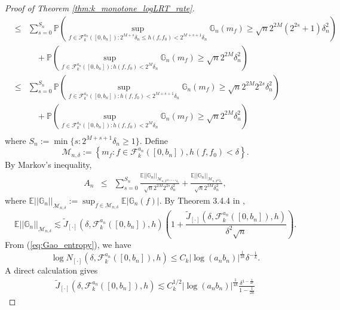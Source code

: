 \documentclass[12pt,letterpaper, twoside, openany]{article}
\theoremstyle{plain}
\begin{document}
\begin{proof}[Proof of Theorem \ref{thm:k_monotone_logLRT_rate}]
\begin{eqnarray*}
	& \leq & \sum^{S_n}_{s=0} \mathbb{P}  \left( \sup_{f \in \mathcal{F}^{a_n}_k([0, b_n]): 2^{M+s} \delta_n \leq  h(f, f_0) < 2^{M + s + 1} \delta_n}  \mathbb{G}_n(m_f)  \geq \sqrt{n} 2^{2M} (2^{2s} + 1) \delta^2_n \right) \\
	&& \quad + \mathbb{P}  \left( \sup_{f \in \mathcal{F}^{a_n}_k([0, b_n]):   h(f, f_0) < 2^M \delta_n}  \mathbb{G}_n(m_f) \geq \sqrt{n} 2^{2M} \delta^2_n \right)\\
	& \leq & \sum^{S_n}_{s=0} \mathbb{P}  \left( \sup_{f \in \mathcal{F}^{a_n}_k([0, b_n]): h(f, f_0) < 2^{M + s + 1} \delta_n}  \mathbb{G}_n(m_f)  \geq \sqrt{n} 2^{2M} 2^{2s}  \delta^2_n \right) \\
	&& \quad + \mathbb{P}  \left( \sup_{f \in \mathcal{F}^{a_n}_k([0, b_n]):   h(f, f_0) < 2^M \delta_n}  \mathbb{G}_n(m_f) \geq \sqrt{n} 2^{2M} \delta^2_n \right)\\
\end{eqnarray*}
where $S_n := \min\{s : 2^{M + s + 1}\delta_n \geq 1 \}$.
Define
\begin{equation*}
	\mathcal{M}_{n, \delta} := \left\{ m_f : f \in \mathcal{F}^{a_n}_k([0, b_n]), h(f, f_0) < \delta \right \}.
\end{equation*}
By Markov's inequality, 
\begin{eqnarray*}
	A_n & \leq & \sum^{S_n}_{s=0} \frac{ \mathbb{E}||\mathbb{G}_n||_{\mathcal{M}_{n, 2^{M + s+1} \delta_n}}}{ \sqrt{n} 2^{2M} 2^{2s}  \delta^2_n } + \frac{ \mathbb{E}||\mathbb{G}_n||_{\mathcal{M}_{n, 2^M \delta_n}}}{\sqrt{n} 2^{2M} \delta^2_n},
\end{eqnarray*}
where $\mathbb{E}||\mathbb{G}_n||_{\mathcal{M}_{n, \delta}} := \sup_{f \in \mathcal{M}_{n, \delta}} \mathbb{E}|\mathbb{G}_n(f)|$. By Theorem 3.4.4 in \cite{van1996weak}, 
\begin{equation*}
	\mathbb{E}||\mathbb{G}_n||_{\mathcal{M}_{n, \delta}} \lesssim \tilde{J}_{[\cdot]}(\delta, \mathcal{F}^{a_n}_k([0, b_n]), h) \left( 1+ \frac{\tilde{J}_{[\cdot]}(\delta, \mathcal{F}^{a_n}_k([0, b_n]), h)}{\delta^2 \sqrt{n}} \right).
\end{equation*}
From (\ref{eq:Gao_entropy}), we have
\begin{equation*}
	\log N_{[\cdot]}(\delta, \mathcal{F}^{a_n}_k([0, b_n]), h) \leq C_k | \log (a_n b_n)|^{\frac{1}{2k}} \delta^{-\frac{1}{k}}.
\end{equation*}
A direct calculation gives
\begin{align}
	\tilde{J}_{[\cdot]}\left(\delta, \mathcal{F}_k^{a_n}([0, b_n]), h\right)
	\lesssim C_k^{1/2}|\log (a_n b_n)|^{\frac{1}{4k}}\frac{\delta^{1-\frac{1}{2k}}}{1-\frac{1}{2k}}

\end{align}
\end{proof}
\end{document}
